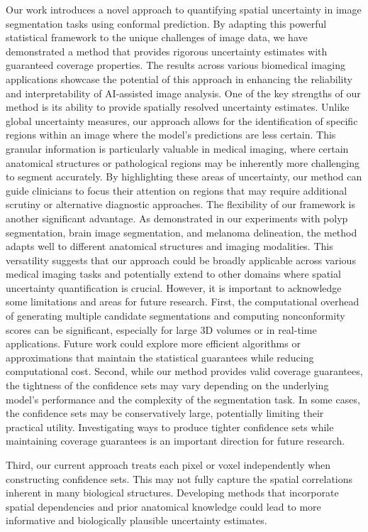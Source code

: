 Our work introduces a novel approach to quantifying spatial uncertainty in image segmentation tasks using conformal prediction. By adapting this powerful statistical framework to the unique challenges of image data, we have demonstrated a method that provides rigorous uncertainty estimates with guaranteed coverage properties. The results across various biomedical imaging applications showcase the potential of this approach in enhancing the reliability and interpretability of AI-assisted image analysis.
One of the key strengths of our method is its ability to provide spatially resolved uncertainty estimates. Unlike global uncertainty measures, our approach allows for the identification of specific regions within an image where the model's predictions are less certain. This granular information is particularly valuable in medical imaging, where certain anatomical structures or pathological regions may be inherently more challenging to segment accurately. By highlighting these areas of uncertainty, our method can guide clinicians to focus their attention on regions that may require additional scrutiny or alternative diagnostic approaches.
The flexibility of our framework is another significant advantage. As demonstrated in our experiments with polyp segmentation, brain image segmentation, and melanoma delineation, the method adapts well to different anatomical structures and imaging modalities. This versatility suggests that our approach could be broadly applicable across various medical imaging tasks and potentially extend to other domains where spatial uncertainty quantification is crucial.
However, it is important to acknowledge some limitations and areas for future research. First, the computational overhead of generating multiple candidate segmentations and computing nonconformity scores can be significant, especially for large 3D volumes or in real-time applications. Future work could explore more efficient algorithms or approximations that maintain the statistical guarantees while reducing computational cost.
Second, while our method provides valid coverage guarantees, the tightness of the confidence sets may vary depending on the underlying model's performance and the complexity of the segmentation task. In some cases, the confidence sets may be conservatively large, potentially limiting their practical utility. Investigating ways to produce tighter confidence sets while maintaining coverage guarantees is an important direction for future research.

Third, our current approach treats each pixel or voxel independently when constructing confidence sets. This may not fully capture the spatial correlations inherent in many biological structures. Developing methods that incorporate spatial dependencies and prior anatomical knowledge could lead to more informative and biologically plausible uncertainty estimates.


